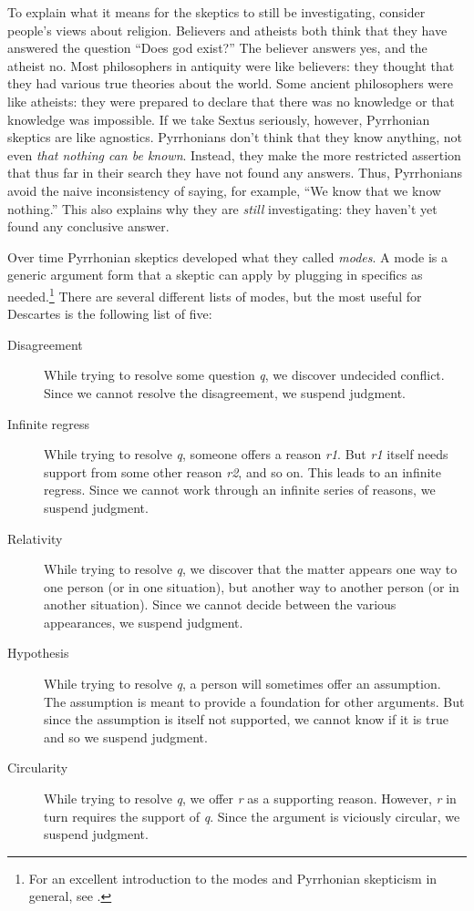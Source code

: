 To explain what it means for the skeptics to still be investigating, consider people's views about religion. Believers and atheists both think that they have answered the question ``Does god exist?'' The believer answers yes, and the atheist no. Most philosophers in antiquity were like believers: they thought that they had various true theories about the world. Some ancient philosophers were like atheists: they were prepared to declare that there was no knowledge or that knowledge was impossible. If we take Sextus seriously, however, Pyrrhonian skeptics are like agnostics. Pyrrhonians don't think that they know anything, not even \textit{that nothing can be known}. Instead, they make the more restricted assertion that thus far in their search they have not found any answers. Thus, Pyrrhonians avoid the naive inconsistency of saying, for example, ``We know that we know nothing.'' This also explains why they are \textit{still} investigating: they haven't yet found any conclusive answer.

Over time Pyrrhonian skeptics developed what they called \textit{modes}. A mode is a generic argument form that a skeptic can apply by plugging in specifics as needed.\footnote{For an excellent introduction to the modes and Pyrrhonian skepticism in general, see \textcite{annasbarnes1994}.} There are several different lists of modes, but the most useful for Descartes is the following list of five:

\begin{description}
    \item[Disagreement] While trying to resolve some question \textit{q}, we discover undecided conflict. Since we cannot resolve the disagreement, we suspend judgment.
    \item[Infinite regress] While trying to resolve \textit{q}, someone offers a reason \textit{r1}. But \textit{r1} itself needs support from some other reason \textit{r2}, and so on. This leads to an infinite regress. Since we cannot work through an infinite series of reasons, we suspend judgment.
    \item[Relativity] While trying to resolve \textit{q}, we discover that the matter appears one way to one person (or in one situation), but another way to another person (or in another situation). Since we cannot decide between the various appearances, we suspend judgment.
    \item[Hypothesis] While trying to resolve \textit{q}, a person will sometimes offer an assumption. The assumption is meant to provide a foundation for other arguments. But since the assumption is itself not supported, we cannot know if it is true and so we suspend judgment.
    \item[Circularity] While trying to resolve \textit{q}, we offer \textit{r} as a supporting reason. However, \textit{r} in turn requires the support of \textit{q}. Since the argument is viciously circular, we suspend judgment.
\end{description}

